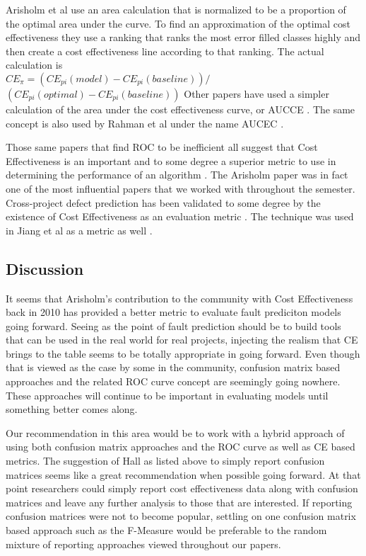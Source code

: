 \documentclass{sig-alternate-05-2015}
\begin{document}
 Arisholm et al use an area calculation that is normalized to be a proportion of the optimal area under the curve.  To find an approximation of the optimal cost effectiveness they use a ranking that ranks the most error filled classes highly and then create a cost effectiveness line according to that ranking.  The actual calculation is\\ $CE_{\pi} = (CE_{pi}(model) - CE_{pi}(baseline))/$\\ $(CE_{pi}(optimal) - CE_{pi}(baseline))$  Other papers have used a simpler calculation of the area under the cost effectiveness curve, or AUCCE \cite{Posnett}.  The same concept is also used by Rahman et al under the name AUCEC \cite{Rahman}.

Those same papers that find ROC to be inefficient all suggest that Cost Effectiveness is an important and to some degree a superior metric to use in determining the performance of an algorithm \cite{Posnett} \cite{Arisholm} \cite{Rahman}.  The Arisholm paper was in fact one of the most influential papers that we worked with throughout the semester.  Cross-project defect prediction has been validated to some degree by the existence of Cost Effectiveness as an evaluation metric \cite{Rahman}.  The technique was used in Jiang et al as a metric as well \cite{Jiang}. 

\subsection{Discussion}
It seems that Arisholm's contribution to the community with Cost Effectiveness back in 2010 has provided a better metric to evaluate fault prediciton models going forward.  Seeing as the point of fault prediction should be to build tools that can be used in the real world for real projects, injecting the realism that CE brings to the table seems to be totally appropriate in going forward.  Even though that is viewed as the case by some in the community, confusion matrix based approaches and the related ROC curve concept are seemingly going nowhere.  These approaches will continue to be important in evaluating models until something better comes along.  

Our recommendation in this area would be to work with a hybrid approach of using both confusion matrix approaches and the ROC curve as well as CE based metrics.  The suggestion of Hall as listed above to simply report confusion matrices seems like a great recommendation when possible going forward.  At that point researchers could simply report cost effectiveness data along with confusion matrices and leave any further analysis to those that are interested.  If reporting confusion matrices were not to become popular, settling on one confusion matrix based approach such as the F-Measure would be preferable to the random mixture of reporting approaches viewed throughout our papers.
\end{document}

